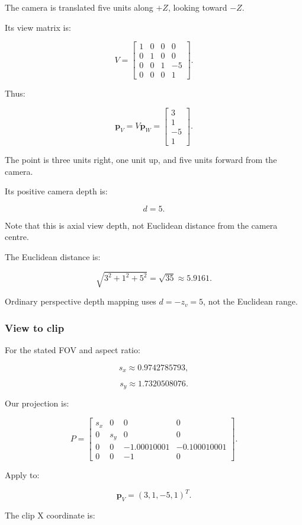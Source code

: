 The camera is translated five units along \(+Z\), looking toward \(-Z\).

Its view matrix is:

\[
 V= \begin{bmatrix} 1&0&0&0\\ 0&1&0&0\\ 0&0&1&-5\\ 0&0&0&1 \end{bmatrix}.
\]

Thus:

\[
 \boxed{ \mathbf p_V= V\mathbf p_W= \begin{bmatrix} 3\\1\\-5\\1 \end{bmatrix} }.
\]

The point is three units right, one unit up, and five units forward from the camera.

Its positive camera depth is:

\[
 \boxed{d=5}.
\]

Note that this is axial view depth, not Euclidean distance from the camera centre.

The Euclidean distance is:

\[
 \sqrt{3^2+1^2+5^2}=\sqrt{35}\approx5.9161.
\]

Ordinary perspective depth mapping uses \(d=-z_v=5\), not the Euclidean range.

\subsubsection{View to clip}\label{02-foundations-ii-ch037-view-to-clip}

For the stated FOV and aspect ratio:

\[
 s_x\approx0.9742785793,
\]

\[
 s_y\approx1.7320508076.
\]

Our projection is:

\[
 P= \begin{bmatrix} s_x&0&0&0\\ 0&s_y&0&0\\ 0&0&-1.00010001&-0.100010001\\ 0&0&-1&0 \end{bmatrix}.
\]

Apply to:

\[
 \mathbf p_V=(3,1,-5,1)^T.
\]

The clip X coordinate is:

